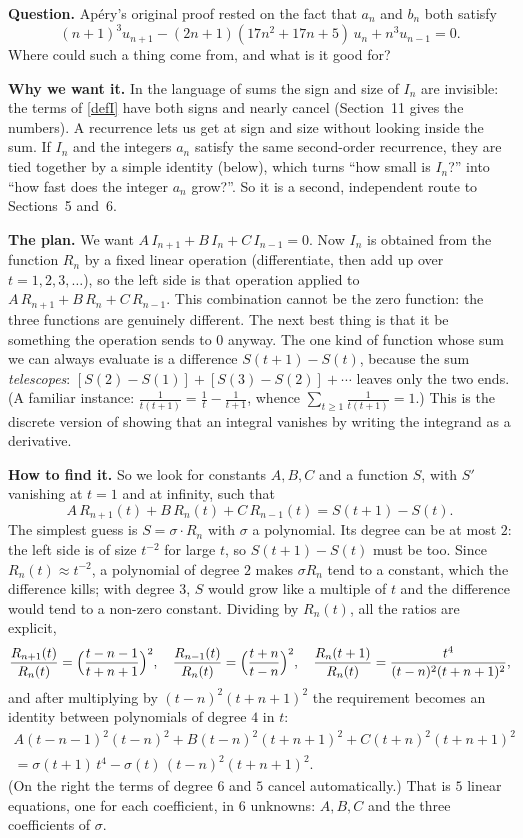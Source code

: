 \documentclass[11pt]{article}
\theoremstyle{remark}
\newcommand{\q}[1]{\medskip\noindent\textbf{#1}}
\begin{document}
\q{Question.} Ap\'ery's original proof rested on the fact that $a_n$ and $b_n$ both satisfy
\[
(n+1)^3u_{n+1}-(2n+1)(17n^2+17n+5)\,u_n+n^3u_{n-1}=0 .
\]
Where could such a thing come from, and what is it good for?

\q{Why we want it.} In the language of sums the sign and size of $I_n$ are invisible: the terms of
\eqref{defI} have both signs and nearly cancel (Section~11 gives the numbers). A recurrence lets us
get at sign and size without looking inside the sum. If $I_n$ and the integers $a_n$ satisfy the
same second-order recurrence, they are tied together by a simple identity (below), which turns
``how small is $I_n$?'' into ``how fast does the integer $a_n$ grow?''. So it is a second,
independent route to Sections~5 and~6.

\q{The plan.} We want $A\,I_{n+1}+B\,I_n+C\,I_{n-1}=0$. Now $I_n$ is obtained from the function
$R_n$ by a fixed linear operation (differentiate, then add up over $t=1,2,3,\dots$), so the left
side is that operation applied to $A\,R_{n+1}+B\,R_n+C\,R_{n-1}$. This combination cannot be the zero
function: the three functions are genuinely different. The next best thing is that it be something
the operation sends to $0$ anyway. The one kind of function whose sum we can always evaluate is a
difference $S(t+1)-S(t)$, because the sum \emph{telescopes}:
$[S(2)-S(1)]+[S(3)-S(2)]+\cdots$ leaves only the two ends. (A familiar instance:
$\frac1{t(t+1)}=\frac1t-\frac1{t+1}$, whence $\sum_{t\ge1}\frac1{t(t+1)}=1$.) This is the discrete
version of showing that an integral vanishes by writing the integrand as a derivative.

\q{How to find it.} So we look for constants $A,B,C$ and a function $S$, with $S'$ vanishing at
$t=1$ and at infinity, such that
\[
A\,R_{n+1}(t)+B\,R_n(t)+C\,R_{n-1}(t)=S(t+1)-S(t).
\]
The simplest guess is $S=\sigma\cdot R_n$ with $\sigma$ a polynomial. Its degree can be at most $2$: the left side is of size $t^{-2}$ for
large $t$, so $S(t+1)-S(t)$ must be too. Since $R_n(t)\approx t^{-2}$, a polynomial of degree $2$
makes $\sigma R_n$ tend to a constant, which the difference kills; with degree $3$, $S$ would grow
like a multiple of $t$ and the difference would tend to a non-zero constant. Dividing by
$R_n(t)$, all the ratios are explicit,
\[
\frac{R_{n+1}(t)}{R_n(t)}=\Bigl(\frac{t-n-1}{t+n+1}\Bigr)^2,\quad
\frac{R_{n-1}(t)}{R_n(t)}=\Bigl(\frac{t+n}{t-n}\Bigr)^2,\quad
\frac{R_n(t+1)}{R_n(t)}=\frac{t^4}{(t-n)^2(t+n+1)^2},
\]
and after multiplying by $(t-n)^2(t+n+1)^2$ the requirement becomes an identity between polynomials
of degree $4$ in $t$:
\begin{multline}\label{poly}
A(t-n-1)^2(t-n)^2+B(t-n)^2(t+n+1)^2+C(t+n)^2(t+n+1)^2\\
=\sigma(t+1)\,t^4-\sigma(t)\,(t-n)^2(t+n+1)^2 .
\end{multline}
(On the right the terms of degree $6$ and $5$ cancel automatically.) That is $5$ linear equations,
one for each coefficient, in $6$ unknowns: $A,B,C$ and the three coefficients of $\sigma$.
\end{document}
